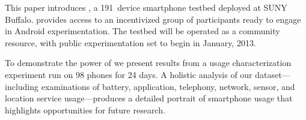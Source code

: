 

This paper introduces \PhoneLab{}, a 191~device smartphone testbed deployed
at SUNY Buffalo. \PhoneLab{} provides access to an incentivized group of
participants ready to engage in Android experimentation. The testbed will be
operated as a community resource, with public experimentation set to begin in
January, 2013.



To demonstrate the power of \PhoneLab{} we present results from a usage
characterization experiment run on 98 phones for 24 days. A holistic analysis
of our dataset---including examinations of battery, application, telephony,
network, sensor, and location service usage---produces a detailed portrait of
smartphone usage that highlights opportunities for future research.
